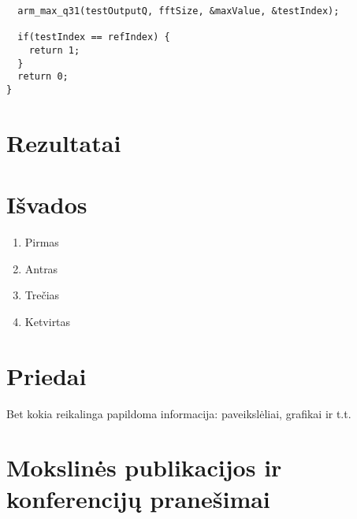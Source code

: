 \documentclass[a4paper, 12pt]{article} %
\begin{document}
\begin{onehalfspacing}
\begin{verbatim}
  arm_max_q31(testOutputQ, fftSize, &maxValue, &testIndex); 

  if(testIndex == refIndex) { 
    return 1;
  } 
  return 0;
}
\end{verbatim}
\newpage
   
\section{Rezultatai}
\section{I\v{s}vados}


\begin{enumerate}
\item Pirmas
\item Antras 
\item Tre\v{c}ias
\item Ketvirtas
\end{enumerate}

\newpage

\section{Priedai}

Bet kokia reikalinga papildoma informacija: paveiksl\.{e}liai, grafikai ir t.t.

\end{onehalfspacing}

\newpage

\section*{Mokslin\.{e}s publikacijos ir konferencij\k{u} prane\v{s}imai}

\end{document}
